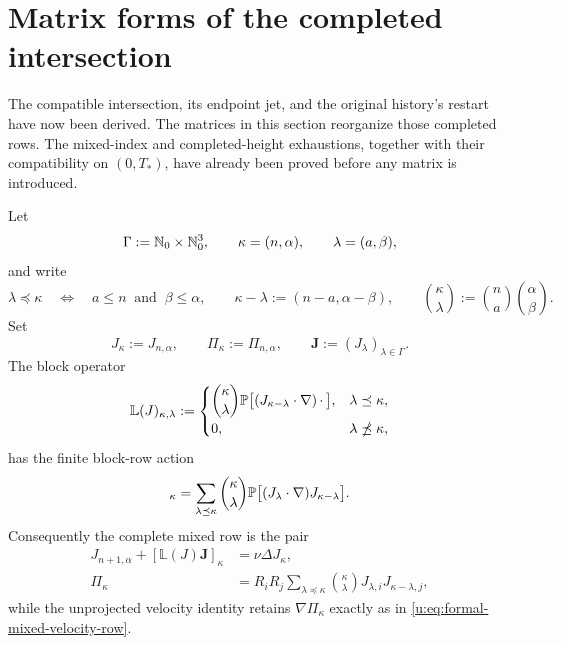 \section{Matrix forms of the completed intersection}
\label{u:sec:matrix-forms}

The compatible intersection, its endpoint jet, and the original history's restart
have now been derived.  The matrices in this section reorganize those
completed rows.  The mixed-index and completed-height exhaustions, together
with their compatibility on \((0,T_*)\), have already been proved before any
matrix is introduced.

\begin{proposition}
\label{u:prop:formal-mixed-index-matrix}
Let
\[
 \Gamma:=\mathbb N_0\times\mathbb N_0^3,
 \qquad
 \kappa=(n,\alpha),
 \qquad
 \lambda=(a,\beta),
\]
and write
\[
 \lambda\preceq\kappa
 \quad\Longleftrightarrow\quad
 a\le n\ \text{ and }\ \beta\le\alpha,
 \qquad
 \kappa-\lambda:=(n-a,\alpha-\beta),
 \qquad
 \binom\kappa\lambda:=\binom na\binom\alpha\beta.
\]
Set
\[
 J_\kappa:=J_{n,\alpha},
 \qquad
 \Pi_\kappa:=\Pi_{n,\alpha},
 \qquad
 \mathbf J:=(J_\lambda)_{\lambda\in\Gamma}.
\]
The block operator
\begin{equation}
 \mathbb L(J)_{\kappa,\lambda}
 :=
 \begin{cases}
 \displaystyle
 \binom\kappa\lambda
 \mathbb P\bigl[(J_{\kappa-\lambda}\cdot\nabla)\,\mathord\cdot\,\bigr],
 &\lambda\preceq\kappa,\\[6pt]
 0,&\lambda\npreceq\kappa,
 \end{cases}
 \label{u:eq:formal-mixed-transport-matrix}
\end{equation}
has the finite block-row action
\begin{equation}
 [\mathbb L(J)\mathbf J]_\kappa
 =\sum_{\lambda\preceq\kappa}\binom\kappa\lambda
   \Pp\bigl[(J_\lambda\cdot\nabla)J_{\kappa-\lambda}\bigr].
 \label{u:eq:formal-mixed-transport-row}
\end{equation}
Consequently the complete mixed row is the pair
\begin{align}
 J_{n+1,\alpha}+[\mathbb L(J)\mathbf J]_\kappa
 &=\nu\Delta J_\kappa,
 \label{u:eq:formal-mixed-projected-matrix-row}\\
 \Pi_\kappa
 &=R_iR_j\sum_{\lambda\preceq\kappa}\binom\kappa\lambda
   J_{\lambda,i}J_{\kappa-\lambda,j},
 \label{u:eq:formal-mixed-matrix-pressure-row}
\end{align}
while the unprojected velocity identity retains
\(\nabla\Pi_\kappa\) exactly as in
\eqref{u:eq:formal-mixed-velocity-row}.


\end{proposition}
